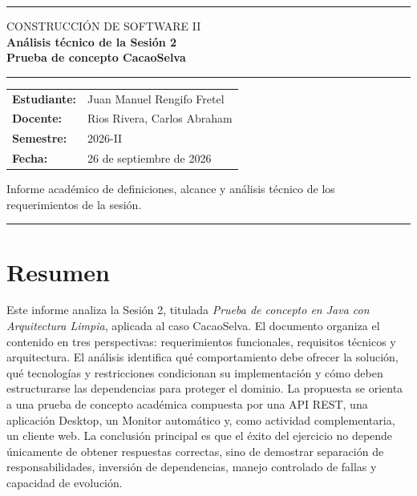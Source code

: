 \documentclass[12pt,letterpaper]{article}
\begin{document}
\begin{titlepage}
\thispagestyle{empty}
\vspace*{1.4cm}
\noindent\textcolor{selva}{\rule{\textwidth}{1.2pt}}
\vspace{0.9cm}
\begin{flushleft}
{\Large\textcolor{selva}{CONSTRUCCIÓN DE SOFTWARE II}}\\[1.25cm]
 {\fontsize{26}{32}\selectfont\bfseries\textcolor{cacao}{Análisis técnico de la Sesión 2}}\\[0.15cm]
 {\fontsize{26}{32}\selectfont\bfseries\textcolor{cacao}{Prueba de concepto CacaoSelva}}
\end{flushleft}
\vspace{0.8cm}
\noindent\textcolor{cacao}{\rule{0.34\textwidth}{4pt}}
\vfill
\begin{flushleft}
\begin{tabular}{@{}ll@{}}
\textbf{Estudiante:} & Juan Manuel Rengifo Fretel\\[0.35cm]
\textbf{Docente:} & Rios Rivera, Carlos Abraham\\[0.35cm]
\textbf{Semestre:} & 2026-II\\[0.35cm]
\textbf{Fecha:} & 26 de septiembre de 2026
\end{tabular}
\end{flushleft}
\vfill
\begin{flushleft}
\small\textcolor{gristexto}{Informe académico de definiciones, alcance y análisis técnico de los requerimientos de la sesión.}
\end{flushleft}
\noindent\textcolor{selva}{\rule{\textwidth}{1.2pt}}
\end{titlepage}


\section*{Resumen}
Este informe analiza la Sesión 2, titulada \textit{Prueba de concepto en Java con Arquitectura Limpia}, aplicada al caso CacaoSelva. El documento organiza el contenido en tres perspectivas: requerimientos funcionales, requisitos técnicos y arquitectura. El análisis identifica qué comportamiento debe ofrecer la solución, qué tecnologías y restricciones condicionan su implementación y cómo deben estructurarse las dependencias para proteger el dominio. La propuesta se orienta a una prueba de concepto académica compuesta por una API REST, una aplicación Desktop, un Monitor automático y, como actividad complementaria, un cliente web. La conclusión principal es que el éxito del ejercicio no depende únicamente de obtener respuestas correctas, sino de demostrar separación de responsabilidades, inversión de dependencias, manejo controlado de fallas y capacidad de evolución.
\end{document}
